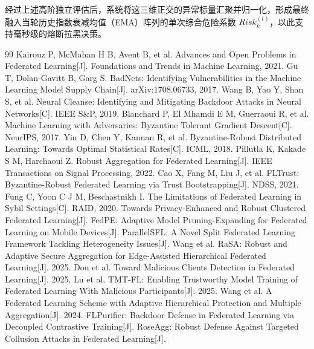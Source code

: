 \documentclass[runningheads]{llncs}
\begin{document}
经过上述高阶独立评估后，系统将这三维正交的异常标量汇聚并归一化，形成最终融入当轮历史指数衰减均值（EMA）阵列的单次综合危险系数 $Risk_{k}^{(t)}$，以此支持毫秒级的熔断拉黑决策。

\begin{thebibliography}{99}
     Kairouz P, McMahan H B, Avent B, et al. Advances and Open Problems in Federated Learning[J]. Foundations and Trends in Machine Learning, 2021.
     Gu T, Dolan-Gavitt B, Garg S. BadNets: Identifying Vulnerabilities in the Machine Learning Model Supply Chain[J]. arXiv:1708.06733, 2017.
     Wang B, Yao Y, Shan S, et al. Neural Cleanse: Identifying and Mitigating Backdoor Attacks in Neural Networks[C]. IEEE S\&P, 2019.
     Blanchard P, El Mhamdi E M, Guerraoui R, et al. Machine Learning with Adversaries: Byzantine Tolerant Gradient Descent[C]. NeurIPS, 2017.
     Yin D, Chen Y, Kannan R, et al. Byzantine-Robust Distributed Learning: Towards Optimal Statistical Rates[C]. ICML, 2018.
     Pillutla K, Kakade S M, Harchaoui Z. Robust Aggregation for Federated Learning[J]. IEEE Transactions on Signal Processing, 2022.
     Cao X, Fang M, Liu J, et al. FLTrust: Byzantine-Robust Federated Learning via Trust Bootstrapping[J]. NDSS, 2021.
     Fung C, Yoon C J M, Beschastnikh I. The Limitations of Federated Learning in Sybil Settings[C]. RAID, 2020.
     Towards Privacy-Enhanced and Robust Clustered Federated Learning[J]. 
     FedPE: Adaptive Model Pruning-Expanding for Federated Learning on Mobile Devices[J]. 
 ParallelSFL: A Novel Split Federated Learning Framework Tackling Heterogeneity Issues[J]. 
     Wang et al. RaSA: Robust and Adaptive Secure Aggregation for Edge-Assisted Hierarchical Federated Learning[J]. 2025.
     Dou et al. Toward Malicious Clients Detection in Federated Learning[J]. 2025.
     Lu et al. TMT-FL: Enabling Trustworthy Model Training of Federated Learning With Malicious Participants[J]. 2025.
     Wang et al. A Federated Learning Scheme with Adaptive Hierarchical Protection and Multiple Aggregation[J]. 2024.
     FLPurifier: Backdoor Defense in Federated Learning via Decoupled Contrastive Training[J]. 
     RoseAgg: Robust Defense Against Targeted Collusion Attacks in Federated Learning[J]. 

\end{thebibliography}
\end{document}
